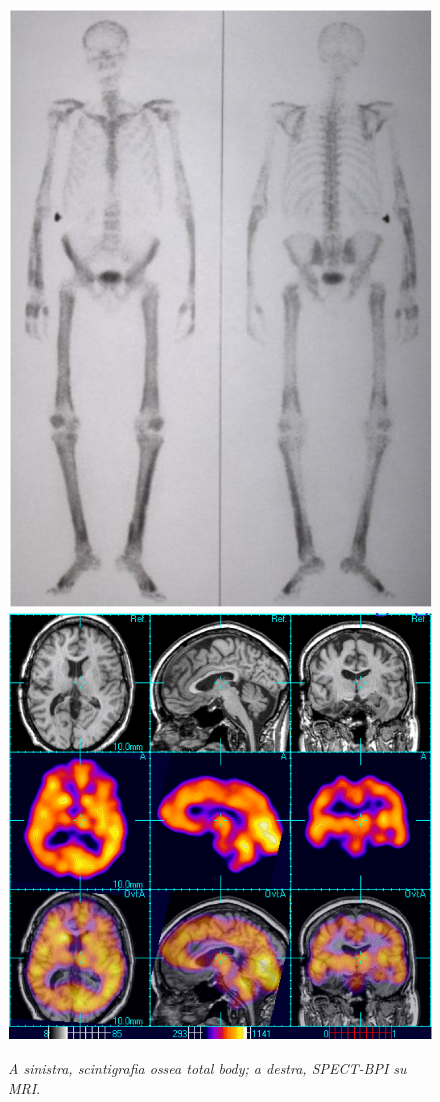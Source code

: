 \documentclass{report}
\numberwithin{equation}{section}
\numberwithin{figure}{section}
\begin{document}
\begin{figure}[htp]
    \centering
    \includegraphics[scale=0.61]{immagini/scintiossea.png}\quad\includegraphics[scale=0.593]{immagini/bpi.png}
    \caption{\label{fig:scintiossea} \textit{A sinistra, scintigrafia ossea total body; a destra, SPECT-BPI su MRI}.}
\end{figure}
\end{document}
